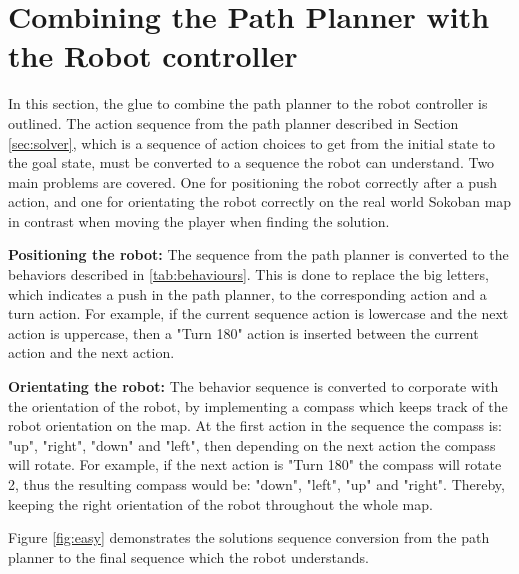 \documentclass[../report.tex]{subfiles}
\begin{document}
\section{Combining the Path Planner with the Robot controller} \label{sec:glue}
In this section, the glue to combine the path planner to the robot controller is outlined. The action sequence from the path planner described in Section \ref{sec:solver}, which is a sequence of action choices to get from the initial state to the goal state, must be converted to a sequence the robot can understand. Two main problems are covered. One for positioning the robot correctly after a push action, and one for orientating the robot correctly on the real world Sokoban map in contrast when moving the player when finding the solution. 

\textbf{Positioning the robot:}
The sequence from the path planner is converted to the behaviors described in \autoref{tab:behaviours}. This is done to replace the big letters, which indicates a push in the path planner, to the corresponding action and a turn action. For example, if the current sequence action is lowercase and the next action is uppercase, then a "Turn 180" action is inserted between the current action and the next action.

\textbf{Orientating the robot:}
The behavior sequence is converted to corporate with the orientation of the robot, by implementing a compass which keeps track of the robot orientation on the map. At the first action in the sequence the compass is: "up", "right", "down" and "left", then depending on the next action the compass will rotate. For example, if the next action is "Turn 180" the compass will rotate 2, thus the resulting compass would be: "down", "left", "up" and "right". Thereby, keeping the right orientation of the robot throughout the whole map.

Figure \ref{fig:easy} demonstrates the solutions sequence conversion from the path planner to the final sequence which the robot understands.
\end{document}
